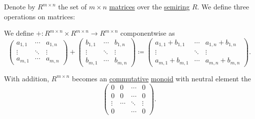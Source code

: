 \begin{proposition}\label{thm:matrix_algebra}
  Denote by \( R^{m \times n} \) the set of \( m \times n \) \hyperref[def:array/matrix]{matrices} over the \hyperref[def:semiring]{semiring} \( R \). We define three operations on matrices:
  \begin{thmenum}
     We define  \( +: R^{m \times n} \times R^{m \times n} \to R^{m \times n} \) componentwise as
    \begin{equation*}
      \begin{pmatrix}
        a_{1,1} & \cdots & a_{1,n} \\
        \vdots  & \ddots & \vdots  \\
        a_{m,1} & \cdots & a_{m,n}
      \end{pmatrix}
      +
      \begin{pmatrix}
        b_{1,1} & \cdots & b_{1,n} \\
        \vdots  & \ddots & \vdots  \\
        b_{m,1} & \cdots & b_{m,n}
      \end{pmatrix}
      \coloneqq
      \begin{pmatrix}
        a_{1,1} + b_{1,1} & \cdots & a_{1,n} + b_{1,n} \\
        \vdots            & \ddots & \vdots            \\
        a_{m,1} + b_{m,1} & \cdots & a_{m,n} + b_{m,n}
      \end{pmatrix}.
    \end{equation*}

    With addition, \( R^{m \times n} \) becomes an \hyperref[def:binary_operation/commutative]{commutative} \hyperref[def:monoid]{monoid} with neutral element the 
    \begin{equation}\label{eq:thm:matrix_algebra/matrix_multiplication/zero}
      \begin{pmatrix}
        0       & 0      & \cdots & 0      \\
        0       & 0      & \cdots & 0      \\
        \vdots  & \cdots & \ddots & \vdots \\
        0       &        & \cdots & 0
      \end{pmatrix}.
    \end{equation}


\end{thmenum}
\end{proposition}
